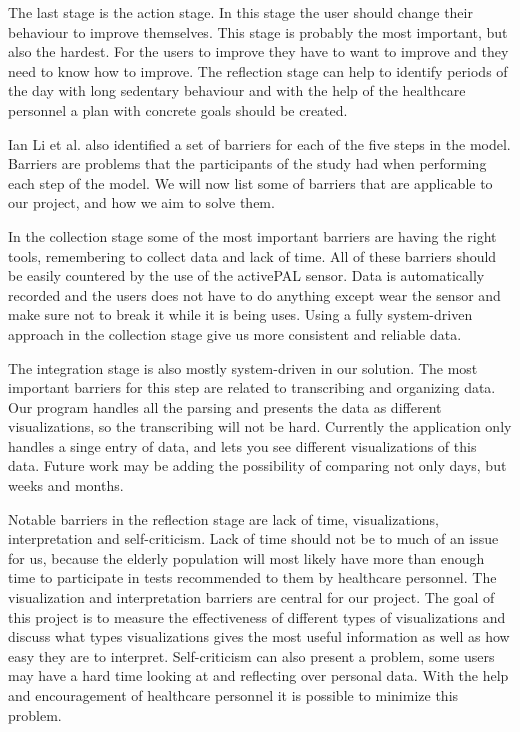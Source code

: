 The last stage is the action stage. In this stage the user should change their behaviour to improve themselves. This stage is probably the most important, but also the hardest. For the users to improve they have to want to improve and they need to know how to improve. The reflection stage can help to identify periods of the day with long sedentary behaviour and with the help of the healthcare personnel a plan with concrete goals should be created. 

Ian Li et al. also identified a set of barriers for each of the five steps in the model. Barriers are problems that the participants of the study had when performing each step of the model. We will now list some of barriers that are applicable to our project, and how we aim to solve them. 

In the collection stage some of the most important barriers are having the right tools, remembering to collect data and lack of time. All of these barriers should be easily countered by the use of the activePAL sensor. Data is automatically recorded and the users does not have to do anything except wear the sensor and make sure not to break it while it is being uses. Using a fully system-driven approach in the collection stage give us more consistent and reliable data.

The integration stage is also mostly system-driven in our solution. The most important barriers for this step are related to transcribing and organizing data. Our program handles all the parsing and presents the data as different visualizations, so the transcribing will not be hard. Currently the application only handles a singe entry of data, and lets you see different visualizations of this data. Future work may be adding the possibility of comparing not only days, but weeks and months.

Notable barriers in the reflection stage are lack of time, visualizations, interpretation and self-criticism. Lack of time should not be to much of an issue for us, because the elderly population will most likely have more than enough time to participate in tests recommended to them by healthcare personnel. The visualization and interpretation barriers are central for our project. The goal of this project is to measure the effectiveness of different types of visualizations and discuss what types visualizations gives the most useful information as well as how easy they are to interpret. Self-criticism can also present a problem, some users may have a hard time looking at and reflecting over personal data. With the help and encouragement of healthcare personnel it is possible to minimize this problem. 

